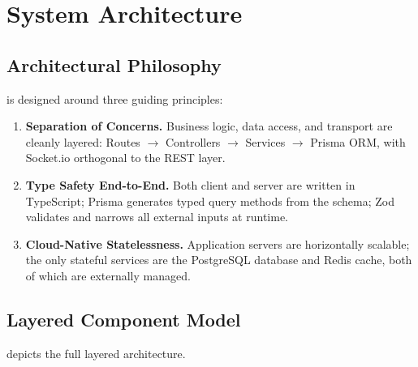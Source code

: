 \section{System Architecture}
\label{sec:architecture}

\subsection{Architectural Philosophy}

\echoray{} is designed around three guiding principles:

\begin{enumerate}[leftmargin=*, label=\textbf{P\arabic*.}]
  \item \textbf{Separation of Concerns.} Business logic, data access, and
    transport are cleanly layered: Routes $\rightarrow$ Controllers
    $\rightarrow$ Services $\rightarrow$ Prisma ORM, with Socket.io
    orthogonal to the REST layer.
  \item \textbf{Type Safety End-to-End.} Both client and server are written in
    TypeScript; Prisma generates typed query methods from the schema; Zod
    validates and narrows all external inputs at runtime.
  \item \textbf{Cloud-Native Statelessness.} Application servers are
    horizontally scalable; the only stateful services are the PostgreSQL
    database and Redis cache, both of which are externally managed.
\end{enumerate}

\subsection{Layered Component Model}

 depicts the full layered architecture.

